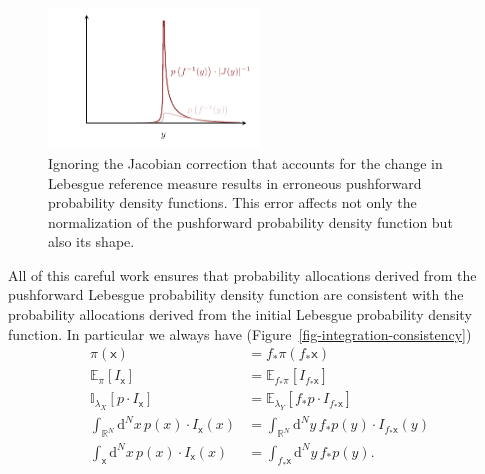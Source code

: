 \documentclass[
  letterpaper,
  DIV=11,
  numbers=noendperiod]{scrartcl}
\begin{document}
\begin{figure}

{\centering \includegraphics[width=0.5\textwidth,height=\textheight]{figures/pushforwards_density_functions/1d/incorrect/incorrect.pdf}

}

\caption{\label{fig-incorrect-density-pushforward}Ignoring the Jacobian
correction that accounts for the change in Lebesgue reference measure
results in erroneous pushforward probability density functions. This
error affects not only the normalization of the pushforward probability
density function but also its shape.}

\end{figure}

All of this careful work ensures that probability allocations derived
from the pushforward Lebesgue probability density function are
consistent with the probability allocations derived from the initial
Lebesgue probability density function. In particular we always have
(Figure~\ref{fig-integration-consistency}) \begin{align*}
\pi( \mathsf{x} ) &= f_{*} \pi ( f_{*} \mathsf{x} )
\\
\mathbb{E}_{\pi} [ I_{\mathsf{x}} ]
&=
\mathbb{E}_{f_{*} \pi} [ I_{f_{*} \mathsf{x}} ]
\\
\mathbb{I}_{\lambda_{X}} [ p \cdot I_{\mathsf{x}} ]
&=
\mathbb{E}_{\lambda_{Y}} [ f_{*} p \cdot I_{f_{*} \mathsf{x}} ]
\\
\int_{\mathbb{R}^{N}} \mathrm{d}^{N} x \,
p(x) \cdot I_{\mathsf{x}}(x)
&=
\int_{\mathbb{R}^{N}} \mathrm{d}^{N} y \,
f_{*} p(y) \cdot I_{f_{*} \mathsf{x}}(y)
\\
\int_{\mathsf{x}} \mathrm{d}^{N} x \,
p(x) \cdot I_{\mathsf{x}}(x)
&=
\int_{f_{*} \mathsf{x}} \mathrm{d}^{N} y \, f_{*} p(y).
\end{align*}
\end{document}
